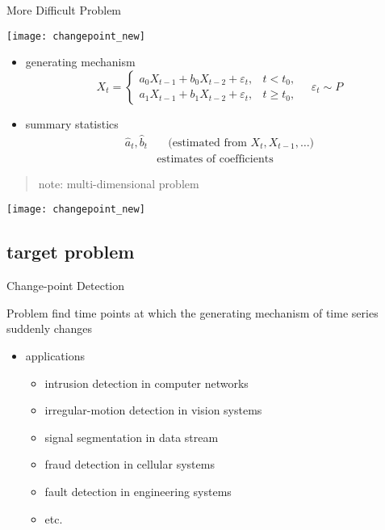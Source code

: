 \documentclass[fleqn,aspectratio=1610]{beamer}
\begin{document}
\begin{frame}[label={sec:orgd1a9695},t]{More Difficult Problem}
\begin{center}
\texttt{[image: changepoint\_new]}
\end{center}
\begin{overprint}
\begin{itemize}
\item generating mechanism
\begin{equation}
  X_{t}=
  \begin{cases}
    a_{0}X_{t-1}+b_{0}X_{t-2}+\varepsilon_{t},&t<t_{0}, \\
    a_{1}X_{t-1}+b_{1}X_{t-2}+\varepsilon_{t},&t\geq t_{0},       
  \end{cases}
  \quad \varepsilon_{t}\sim P
\end{equation}
\end{itemize}
\begin{itemize}
\item summary statistics
\begin{align}
  \hat{a}_{t}, \hat{b}_{t}
  &\quad
    \text{(estimated from \(X_{t},X_{t-1},\dotsc\))}\\
  &\text{estimates of coefficients}
\end{align}
\end{itemize}
\begin{quote}
note: \alert{multi-dimensional problem}
\end{quote}
\begin{center}
\texttt{[image: changepoint\_new]}
\end{center}
\end{overprint}
\end{frame}

\subsection{target problem}
\label{sec:orgb6abd6a}
\begin{frame}[label={sec:orga4bbac1}]{Change-point Detection}
\begin{alertblock}{Problem}
find time points at which 
the generating mechanism of time series suddenly changes
\bigskip
\end{alertblock}
\begin{itemize}
\item applications
\begin{itemize}
\item intrusion detection in computer networks
\item irregular-motion detection in vision systems
\item signal segmentation in data stream
\item fraud detection in cellular systems
\item fault detection in engineering systems
\item etc.
\end{itemize}
\end{itemize}
\end{frame}
\end{document}
